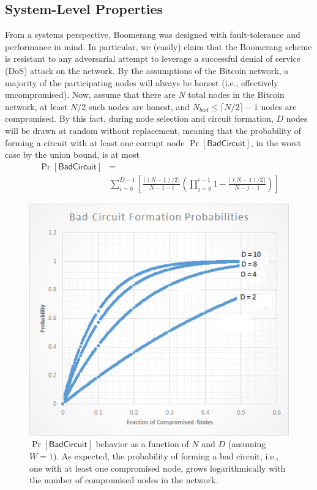 \subsection{System-Level Properties}
From a systems perspective, Boomerang was designed with fault-tolerance and performance in mind. In particular, we (easily) claim that the Boomerang scheme is resistant to any adversarial attempt to leverage a successful denial of service (DoS) attack on the network. By the assumptions of the Bitcoin network, a majority of the participating nodes will always be honest (i.e., effectively uncompromised). Now, assume that there are $N$ total nodes in the Bitcoin network, at least $N/2$ such nodes are honest, and $N_{bad} \leq \lceil N/2 \rceil - 1$ nodes are compromised. By this fact, during node selection and circuit formation, $D$ nodes will be drawn at random without replacement, meaning that the probability of forming a circuit with at least one corrupt node $\Pr[\mathsf{BadCircuit}]$, in the worst case by the union bound, is at most
\begin{align*}
\Pr[\mathsf{BadCircuit}] & = \\
& \sum_{i=0}^{D-1} \left[ \frac{\lceil (N-1)/2 \rceil}{N - 1 - i}\left( \prod_{j=0}^{i-1} 1 - \frac{ \lceil (N-1)/2 \rceil}{N-j-1} \right) \right]
\end{align*}

\begin{figure}[ht!]
\begin{center}
\includegraphics[scale=0.65]{./images/badcircuit_plot.png}
\caption{$\Pr[\mathsf{BadCircuit}]$ behavior as a function of $N$ and $D$ (assuming $W = 1$). As expected, the probability of forming a bad circuit, i.e., one with at least one compromised node, grows logarithmically with the number of compromised nodes in the network.}
\label{fig:bitcoin_peer_protocol}
\end{center}
\end{figure}


